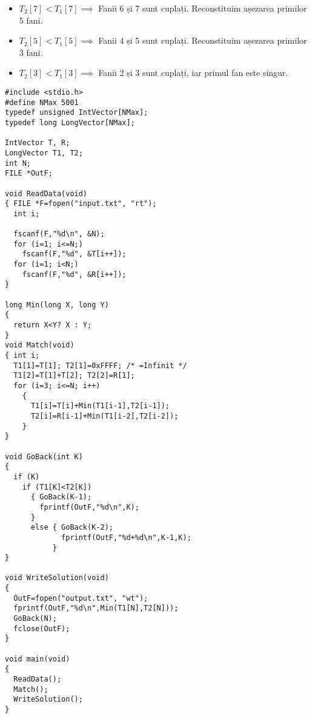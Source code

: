 \begin{itemize}

\item $T_2[7]<T_1[7] \implies$ Fanii 6 și 7 sunt cuplați. Reconstituim
  așezarea primilor 5 fani.

\item $T_2[5]<T_1[5] \implies$ Fanii 4 și 5 sunt cuplați. Reconstituim
  așezarea primilor 3 fani.

\item $T_2[3]<T_1[3] \implies$ Fanii 2 și 3 sunt cuplați, iar primul fan este
  singur.

\end{itemize}

\begin{verbatim}
#include <stdio.h>
#define NMax 5001
typedef unsigned IntVector[NMax];
typedef long LongVector[NMax];

IntVector T, R;
LongVector T1, T2;
int N;
FILE *OutF;

void ReadData(void)
{ FILE *F=fopen("input.txt", "rt");
  int i;

  fscanf(F,"%d\n", &N);
  for (i=1; i<=N;)
    fscanf(F,"%d", &T[i++]);
  for (i=1; i<N;)
    fscanf(F,"%d", &R[i++]);
}

long Min(long X, long Y)
{
  return X<Y? X : Y;
}
void Match(void)
{ int i;
  T1[1]=T[1]; T2[1]=0xFFFF; /* =Infinit */
  T1[2]=T[1]+T[2]; T2[2]=R[1];
  for (i=3; i<=N; i++)
    {
      T1[i]=T[i]+Min(T1[i-1],T2[i-1]);
      T2[i]=R[i-1]+Min(T1[i-2],T2[i-2]);
    }
}

void GoBack(int K)
{
  if (K)
    if (T1[K]<T2[K])
      { GoBack(K-1);
        fprintf(OutF,"%d\n",K);
      }
      else { GoBack(K-2);
             fprintf(OutF,"%d+%d\n",K-1,K);
           }
}

void WriteSolution(void)
{
  OutF=fopen("output.txt", "wt");
  fprintf(OutF,"%d\n",Min(T1[N],T2[N]));
  GoBack(N);
  fclose(OutF);
}

void main(void)
{
  ReadData();
  Match();
  WriteSolution();
}
\end{verbatim}
